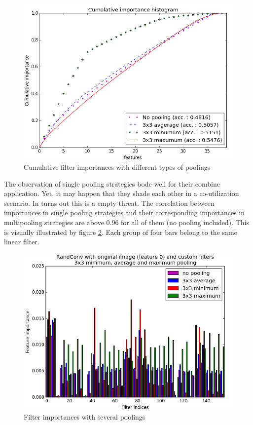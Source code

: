 \documentclass[a4paper]{report}
\begin{document}
	
	\begin{figure}
		\centering
			\includegraphics[width=1.0\textwidth]{images/FIPoolCumul.png}
		\caption{\label{fig:FIPoolCumul}Cumulative filter importances with different types of poolings}
	\end{figure}
	
	\par
	The observation of single pooling strategies bode well for their combine application. Yet, it may happen that they shade each other in a co-utilization scenario. In turns out this is a empty threat. The correlation between importances in single pooling strategies and their corresponding importances in multipooling strategies are above 0.96 for all of them (no pooling included). This is visually illustrated by figure \ref{fig:FIPoolNoAvgMinMax}. Each group of four bars belong to the same linear filter. 
	
	\begin{figure}
		\centering
			\includegraphics[width=1.0\textwidth]{images/FIPoolNoAvgMinMax.png}
		\caption{\label{fig:FIPoolNoAvgMinMax}Filter importances with several poolings}
	\end{figure}
	
\end{document}
